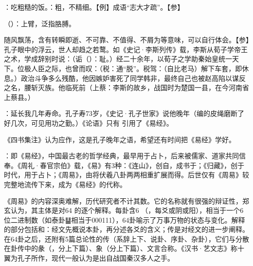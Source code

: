 {
\item {}：吃粗糙的饭。：粗，不精细。【例】成语“志大才疏”。【参】
\item {}（）：上臂，泛指胳膊。
\item {}随风飘荡，含有转瞬即逝、不可靠、不值得、不屑为等意味，可以自行体会。【参】孔子眼中的浮云，世人却趋之若鹜。如《史记·李斯列传》载，李斯从荀子学帝王之术，学成辞别时说：（诟（）：耻。）经二十余年，以荀子之学助秦始皇统一天下。位极人臣之际，也曾而叹：（税：通“脱”。税驾：（自比老马）解下车套，即休息。）政治斗争多么残酷，他因嫉妒害死了同学韩非，最终自己也被赵高陷以谋反之名，腰斩灭族。他临死前（上蔡：李斯的故乡，战国时为楚国一县，在今河南省上蔡县。）
}
{}


{
\item {}：延长我几年寿命。孔子寿73岁，《史记·孔子世家》说他晚年（编的皮绳磨断了好几次，可见用功之勤。）《论语》只有  引用了《易经》。

《四书集注》认为应作，这是孔子晚年之语，希望还有时间把《易经》学好。

\item {}：即《易经》，中国最古老的哲学经典，最早用于占卜，后来被儒家、道家共同信奉。《周礼·春官宗伯》载，《易》有3种：《连山》，创自，成书于；《归藏》，创于时代，用于占卜；《周易》，由将伏羲八卦两两相重扩展而得。后世仅有《周易》较完整地流传下来，成为《易经》的代称。

《周易》的内容深奥难解，历代研究者不计其数。它的名称就有很强的辩证性，郑玄认为，其主体是对64 的逐个解释。每卦含6 （，每爻或阴或阳），相当于一个6位二进制数（如泰卦{䷊}相当于000111），64卦喻示了万事万物的状态与变化。解释的部分包括和：经文先概说本卦，再分述各爻的含义；传是对经文的进一步阐释。在64卦之后，还附有5篇总论性的传（系辞上下、说卦、序卦、杂卦），它们与分散在卦传中的彖（，分上下篇）、象（分上下篇）、文言合称。《汉书·艺文志》称十翼为孔子所作，现代一般认为是出自战国秦汉多人之手。
}
{}


